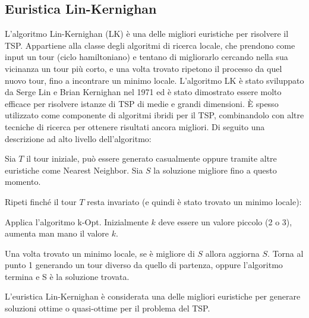 \documentclass[a4paper,12pt]{report}
\begin{document}
\subsection{Euristica Lin-Kernighan}
L'algoritmo Lin-Kernighan (LK)\cite{LK} è una delle migliori euristiche per risolvere il TSP. Appartiene alla classe degli algoritmi di ricerca locale, che prendono come input un tour (ciclo hamiltoniano) e tentano di migliorarlo cercando nella sua vicinanza un tour più corto, e una volta trovato ripetono il processo da quel nuovo tour, fino a incontrare un minimo locale.
L'algoritmo LK è stato sviluppato da Serge Lin e Brian Kernighan nel 1971 ed è stato dimostrato essere molto efficace per risolvere istanze di TSP di medie e grandi dimensioni. È spesso utilizzato come componente di algoritmi ibridi per il TSP, combinandolo con altre tecniche di ricerca per ottenere risultati ancora migliori. Di seguito una descrizione ad alto livello dell'algoritmo:
\begin{tcolorbox}[colframe=black,colback=white,boxrule=0.5pt, sharp corners]
  \begin{legal}
    \item Sia $T$ il tour iniziale, può essere generato casualmente oppure tramite altre euristiche come Nearest Neighbor. Sia $S$ la soluzione migliore fino a questo momento.
    \item Ripeti finché il tour $T$ resta invariato (e quindi è stato trovato un minimo locale):
    \begin{legal}
      \item Applica l'algoritmo k-Opt. Inizialmente $k$ deve essere un valore piccolo (2 o 3), aumenta man mano il valore $k$.
    \end{legal}
    \item Una volta trovato un minimo locale, se è migliore di $S$ allora aggiorna $S$. Torna al punto 1 generando un tour diverso da quello di partenza, oppure l'algoritmo termina e S è la soluzione trovata.
  \end{legal}
\end{tcolorbox}
\hfill \break
L'euristica Lin-Kernighan è considerata una delle migliori euristiche per generare soluzioni ottime o quasi-ottime per il problema del TSP\cite{Helsgaun}.

\end{document}

